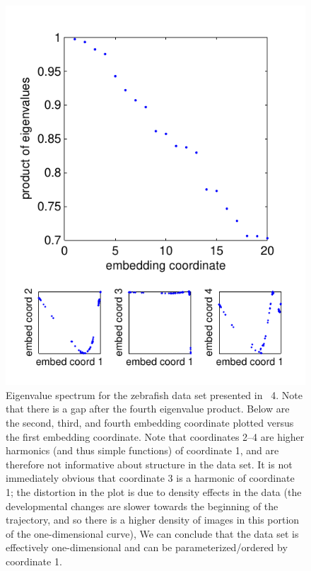 \begin{figure}
\includegraphics{figS4}
\caption[Eigenvalue spectrum for the zebrafish data set]{Eigenvalue spectrum for the zebrafish data set presented in \fig~4. Note that there is a gap after the fourth eigenvalue product. Below are the second, third, and fourth embedding coordinate plotted versus the first embedding coordinate. Note that coordinates 2--4 are higher harmonics (and thus simple functions) of coordinate 1, and are therefore not informative about structure in the data set.  It is not immediately obvious that coordinate 3 is a harmonic of coordinate 1; the distortion in the plot is due to density effects in the data (the developmental changes are slower towards the beginning of the trajectory, and so there is a higher density of images in this portion of the one-dimensional curve), We can conclude that the data set is effectively one-dimensional and can be parameterized/ordered by coordinate 1.}
\end{figure}


